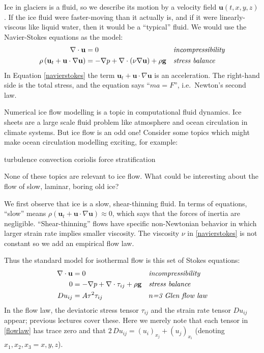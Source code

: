 \documentclass[titlepage,a4paper,final,12pt]{scrartcl}
\begin{document}
Ice in glaciers is a fluid, so we describe its motion by a velocity field $\mathbf{u}(t,x,y,z)$.  If the ice fluid were faster-moving than it actually is, and if it were linearly-viscous like liquid water, then it would be a ``typical'' fluid.  We would use the Navier-Stokes equations as the model:
\begin{align}
\nabla \cdot \mathbf{u} &= 0 &&\text{\emph{incompressibility}} \label{incompressible} \\
\rho \left(\mathbf{u}_t + \mathbf{u}\cdot\nabla \mathbf{u}\right) &= -\nabla p + \nabla \cdot (\nu \nabla \mathbf{u}) + \rho \mathbf{g} &&\text{\emph{stress balance}} \label{navierstokes}
\end{align}
In Equation \eqref{navierstokes} the term $\mathbf{u}_t + \mathbf{u}\cdot\nabla \mathbf{u}$ is an acceleration.  The right-hand side is the total stress, and the equation says ``$ma=F$'', i.e.~Newton's second law.

Numerical ice flow modelling is a topic in computational fluid dynamics.  Ice sheets are a large scale fluid problem like atmosphere and ocean circulation in climate systems.  But ice flow is an odd one!  Consider some topics which might make ocean circulation modelling exciting, for example:
  \begin{center} turbulence \qquad convection \qquad  coriolis force  \qquad stratification
  \end{center}
None of these topics are relevant to ice flow.  What could be interesting about the flow of slow, laminar, boring old ice?

We first observe that ice is a slow, shear-thinning fluid.  In terms of equations, ``slow'' means $\rho \left(\mathbf{u}_t + \mathbf{u}\cdot\nabla \mathbf{u}\right) \approx 0$, which says that the forces of inertia are negligible.  ``Shear-thinning'' flows have specific non-Newtonian behavior in which larger strain rate implies smaller viscosity.  The viscosity $\nu$ in \eqref{navierstokes} is not constant so we add an empirical flow law.

Thus the standard model for isothermal flow is this set of Stokes equations:
\begin{align}
\nabla \cdot \mathbf{u} &= 0 &&\text{\emph{incompressibility}} \label{incompressibleagain} \\
0 &= - \nabla p + \nabla \cdot \tau_{ij} + \rho \mathbf{g} &&\text{\emph{stress balance}} \label{forcebalance} \\
Du_{ij} &= A \tau^2 \tau_{ij} &&\text{\emph{$n$=3 Glen flow law}} \label{flowlaw}
\end{align}
In the flow law, the deviatoric stress tensor $\tau_{ij}$ and the strain rate tensor $Du_{ij}$ appear; previous lectures cover these.  Here we merely note that each tensor in \eqref{flowlaw} has trace zero and that $2\,Du_{ij} = (u_i)_{x_j}+(u_j)_{x_i}$ (denoting $x_1,x_2,x_3=x,y,z$).
\end{document}
